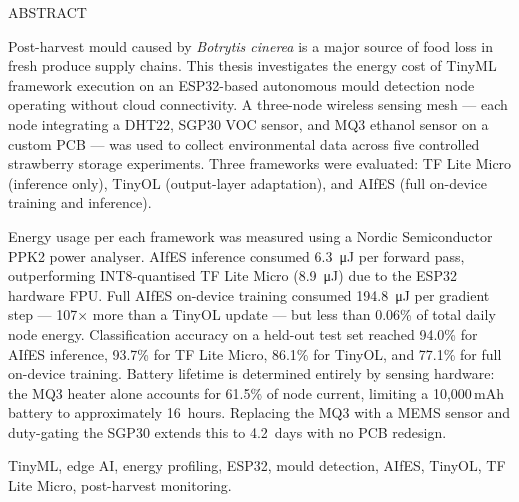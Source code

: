 \begin{center}
    ABSTRACT
\vspace{5mm} %
\end{center}

Post-harvest mould caused by \textit{Botrytis cinerea} is a major source of food loss in fresh produce supply chains. This thesis investigates the energy cost of TinyML framework execution on an ESP32-based autonomous mould detection node operating without cloud connectivity. A three-node wireless sensing mesh --- each node integrating a DHT22, SGP30 VOC sensor, and MQ3 ethanol sensor on a custom PCB --- was used to collect environmental data across five controlled strawberry storage experiments. Three frameworks were evaluated: TF Lite Micro (inference only), TinyOL (output-layer adaptation), and AIfES (full on-device training and inference).

Energy usage per each framework was measured using a Nordic Semiconductor PPK2 power analyser. AIfES inference consumed \SI{6.3}{\micro\joule} per forward pass, outperforming INT8-quantised TF Lite Micro (\SI{8.9}{\micro\joule}) due to the ESP32 hardware FPU. Full AIfES on-device training consumed \SI{194.8}{\micro\joule} per gradient step --- 107$\times$ more than a TinyOL update --- but less than 0.06\% of total daily node energy. Classification accuracy on a held-out test set reached 94.0\% for AIfES inference, 93.7\% for TF Lite Micro, 86.1\% for TinyOL, and 77.1\% for full on-device training. Battery lifetime is determined entirely by sensing hardware: the MQ3 heater alone accounts for 61.5\% of node current, limiting a 10,000\,mAh battery to approximately 16~hours. Replacing the MQ3 with a MEMS sensor and duty-gating the SGP30 extends this to 4.2~days with no PCB redesign.

\vspace{5mm}
 TinyML, edge AI, energy profiling, ESP32, mould detection, AIfES, TinyOL, TF Lite Micro, post-harvest monitoring.
